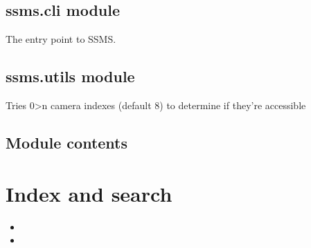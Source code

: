 \documentclass[letterpaper,10pt,english]{sphinxmanual}
\begin{document}
\section{ssms.cli module}
\label{\detokenize{ssms:module-ssms.cli}}\label{\detokenize{ssms:ssms-cli-module}}

\begin{fulllineitems}
\label{\detokenize{ssms:ssms.cli.cli}}
The entry point to SSMS.

\end{fulllineitems}



\section{ssms.utils module}
\label{\detokenize{ssms:module-ssms.utils}}\label{\detokenize{ssms:ssms-utils-module}}

\begin{fulllineitems}
\label{\detokenize{ssms:ssms.utils.list_cameras}}
Tries 0\sphinxhyphen{}\textgreater{}n camera indexes (default 8) to determine if they’re accessible

\end{fulllineitems}



\section{Module contents}
\label{\detokenize{ssms:module-ssms}}\label{\detokenize{ssms:module-contents}}

\chapter{Index and search}
\label{\detokenize{index:index-and-search}}\begin{itemize}
\item {} 

\item {} 

\end{itemize}
\end{document}
